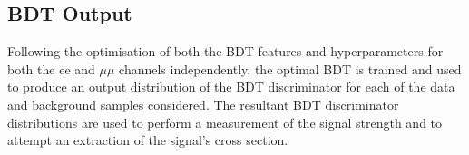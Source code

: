 
\subsection{BDT Output}
Following the optimisation of both the BDT features and hyperparameters for both the ee and $\mu\mu$ channels independently, the optimal BDT is trained and used to produce an output distribution of the BDT discriminator for each of the data and background samples considered.
The resultant BDT discriminator distributions are used to perform a measurement of the signal strength and to attempt an extraction of the signal's cross section.

